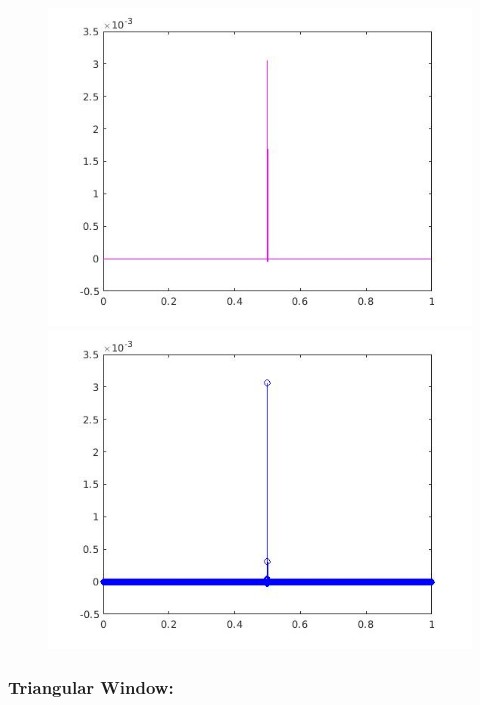 \documentclass[a4paper,11pt]{article}
\begin{document}
\begin{figure}[!hp]
\centering
\begin{minipage}{.5\textwidth}
  \centering
  \includegraphics[width=1\linewidth]{images/lab2_17.jpg}
\end{minipage}%
\begin{minipage}{.5\textwidth}
  \centering
  \includegraphics[width=1\linewidth]{images/lab2_18.jpg}
\end{minipage}
\end{figure}

\newpage

\subsubsection{Triangular Window:}
\end{document}
